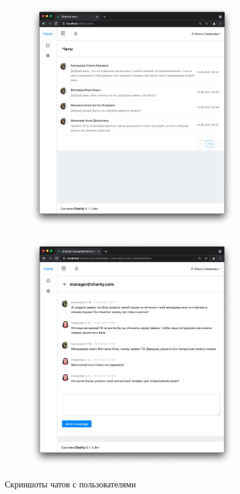 \documentclass[a4paper,12pt,reqno]{article}
\begin{document}
	\begin{figure}[H]
	    \centering
		\begin{subfigure}[b]{0.475\linewidth}
			\includegraphics[width=\linewidth]{img/ro/chats.png}
		\end{subfigure}
		\begin{subfigure}[b]{0.475\linewidth}
			\includegraphics[width=\linewidth]{img/ro/one_chat.png}
		\end{subfigure}
		\caption{Скриншоты чатов с пользователями}
		\label{pic: chats}
	\end{figure}
	
\end{document}
